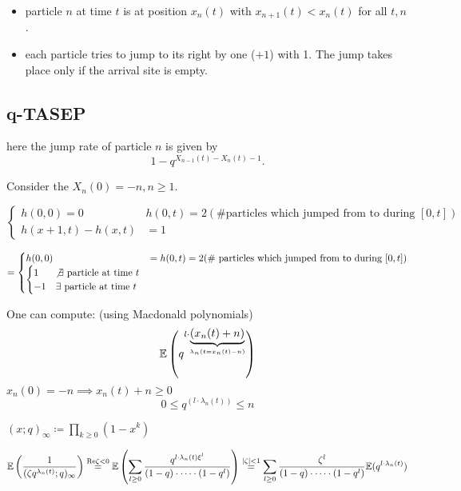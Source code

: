 \begin{itemize}
    \item {} particle $n$ at time $t$ is at position $x_n(t)$ with $x_{n+1}(t)<x_n(t)$ for all $t,n$.
    \item {} each particle tries to jump to its right by one ($+1$) with  1. The jump takes place only if the arrival site is empty.
\end{itemize}

\subsection{q-TASEP}

here the jump rate of particle $n$ is given by \[1-q^{X_{n-1}(t)-X_n(t)-1}.\]

Consider the  $X_n(0)=-n,n\geq 1$.

\[\begin{cases}
    h(0,0)=0&h(0,t)=2(\text{\# particles which jumped from  to  during }[0,t])\\
    h(x+1,t)-h(x,t)&=1 
\end{cases}\]

\[=\begin{cases}
    h(0,0)&=h(0,t)=2(\text{\# particles which jumped from  to  during }[0,t])\\
    \begin{cases}
        1 & \not\exists \text{ particle at time }t\\ 
        -1 & \exists \text{ particle at time }t
\end{cases}\end{cases}
\]

One can compute: (using Macdonald polynomials)
\begin{align*}
    \mathbb{E}\left(q^{l\cdot \underbrace{(x_n(t)+n)}_{\lambda_n(t=x_n(t)-n)}}\right)
\end{align*} 
$x_n(0)=-n\implies x_n(t)+n\geq 0$
\[0\leq q^(l\cdot \lambda_n(t))\leq n\]

 $(x;q)_\infty\coloneqq \prod_{k\geq 0}(1-x^k)$

\[\mathbb{E}\left(\frac{1}{(\zeta q^{\lambda_n(t)};q)_\infty}\right)\stackrel{\text{Re}\zeta<0}{=}\mathbb{E}\left(\sum_{l\geq 0}\frac{q^{l\cdot \lambda_n(t)\xi^l}}{(1-q)\cdot\dots\cdot (1-q^l)}\right)\stackrel{|\zeta|<1}{=}\sum_{l\geq 0}\frac{\zeta^l}{(1-q)\cdot\dots\cdot (1-q^l)}\mathbb{E}(q^{l\cdot \lambda_n(t)})\]

